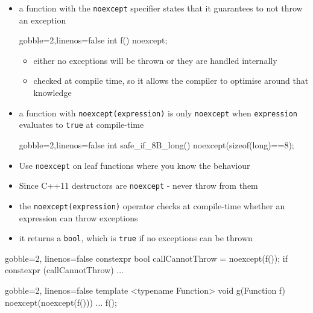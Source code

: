 \begin{frame}[fragile]
  \begin{block}{}
    \begin{itemize}
      \item a function with the \texttt{noexcept} specifier states that it guarantees to not throw an exception
      \begin{cppcode*}{gobble=2,linenos=false}
        int f() noexcept;
      \end{cppcode*}
      \begin{itemize}
        \item either no exceptions will be thrown or they are handled internally
        \item checked at compile time, so it allows the compiler to optimise around that knowledge
      \end{itemize}
      \item a function with \texttt{noexcept(expression)} is only \texttt{noexcept} when \texttt{expression} evaluates to \texttt{true} at compile-time
      \begin{cppcode*}{gobble=2,linenos=false}
        int safe_if_8B_long() noexcept(sizeof(long)==8);
      \end{cppcode*}
      \item Use \texttt{noexcept} on leaf functions where you know the behaviour
      \item Since C++11 destructors are \texttt{noexcept} - never throw from them
    \end{itemize}
  \end{block}
\end{frame}


\begin{frame}[fragile]
  \begin{block}{}
    \begin{itemize}
      \item the \texttt{noexcept(expression)} operator checks at compile-time whether an expression can throw exceptions
      \item it returns a \texttt{bool}, which is \texttt{true} if no exceptions can be thrown
    \end{itemize}
  \end{block}
  \begin{block}{}
    \begin{cppcode*}{gobble=2, linenos=false}
      constexpr bool callCannotThrow = noexcept(f());
      if constexpr (callCannotThrow) { ... }
    \end{cppcode*}
  \end{block}
  \begin{block}{}
    \begin{cppcode*}{gobble=2, linenos=false}
      template <typename Function>
      void g(Function f) noexcept(noexcept(f())) {
        ...
        f();
      }
    \end{cppcode*}
  \end{block}
\end{frame}
